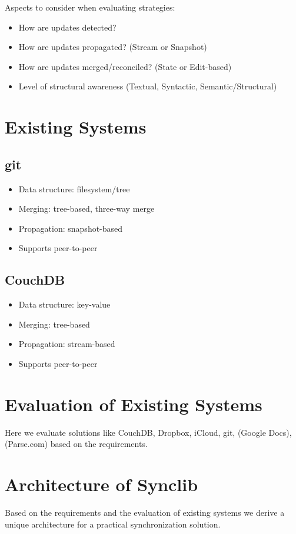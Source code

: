 Aspects to consider when evaluating strategies:

\begin{itemize}
\item How are updates detected?
\item How are updates propagated? (Stream or Snapshot)
\item How are updates merged/reconciled? (State or Edit-based)
\item Level of structural awareness (Textual, Syntactic, Semantic/Structural)
\end{itemize}

\section{Existing Systems}

\subsection{git}

\begin{itemize}
\item
  Data structure: filesystem/tree
\item
  Merging: tree-based, three-way merge
\item
  Propagation: snapshot-based
\item
  Supports peer-to-peer
\end{itemize}

\subsection{CouchDB}

\begin{itemize}
\item
  Data structure: key-value
\item
  Merging: tree-based
\item
  Propagation: stream-based
\item
  Supports peer-to-peer
\end{itemize}

\section{Evaluation of Existing Systems}
Here we evaluate solutions like CouchDB, Dropbox, iCloud, git, (Google Docs), (Parse.com) based on the requirements.

\section{Architecture of Synclib}
Based on the requirements and the evaluation of existing systems we derive a unique architecture for a practical synchronization solution.

